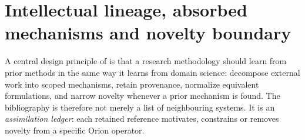 \section{Intellectual lineage, absorbed mechanisms and novelty boundary}
\label{sec:intellectual-lineage}
A central design principle of \RAKL{} is that a research methodology should learn from prior methods in the same way it learns from domain science: decompose external work into scoped mechanisms, retain provenance, normalize equivalent formulations, and narrow novelty whenever a prior mechanism is found. The bibliography is therefore not merely a list of neighbouring systems. It is an \emph{assimilation ledger}: each retained reference motivates, constrains or removes novelty from a specific Orion operator.






